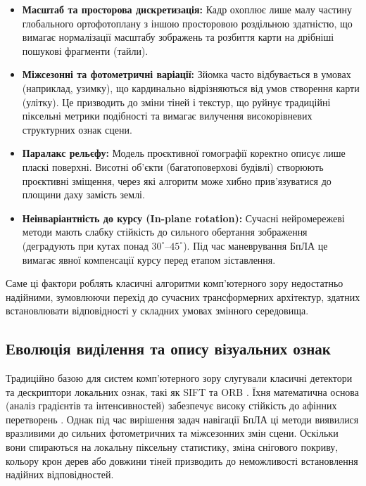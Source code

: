 \documentclass[a4paper, 12pt, titlepage]{article}
\begin{document}
\begin{itemize}
    \item \textbf{Масштаб та просторова дискретизація:} Кадр охоплює лише малу частину глобального ортофотоплану з іншою просторовою роздільною здатністю, що вимагає нормалізації масштабу зображень та розбиття карти на дрібніші пошукові фрагменти (тайли).
    \item \textbf{Міжсезонні та фотометричні варіації:} Зйомка часто відбувається в умовах (наприклад, узимку), що кардинально відрізняються від умов створення карти (улітку). Це призводить до зміни тіней і текстур, що руйнує традиційні піксельні метрики подібності та вимагає вилучення високорівневих структурних ознак сцени.
    \item \textbf{Паралакс рельєфу:} Модель проєктивної гомографії коректно описує лише пласкі поверхні. Висотні об'єкти (багатоповерхові будівлі) створюють проєктивні зміщення, через які алгоритм може хибно прив'язуватися до площини даху замість землі.
    \item \textbf{Неінваріантність до курсу (In-plane rotation):} Сучасні нейромережеві методи мають слабку стійкість до сильного обертання зображення (деградують при кутах понад $30^\circ$--$45^\circ$). Під час маневрування БпЛА це вимагає явної компенсації курсу перед етапом зіставлення.
\end{itemize}

Саме ці фактори роблять класичні алгоритми комп'ютерного зору недостатньо надійними, зумовлюючи перехід до сучасних трансформерних архітектур, здатних встановлювати відповідності у складних умовах змінного середовища.

\subsection{Еволюція виділення та опису візуальних ознак}

Традиційно базою для систем комп'ютерного зору слугували класичні детектори та дескриптори локальних ознак, такі як SIFT \cite{sift} та ORB \cite{orb}. Їхня математична основа (аналіз градієнтів та інтенсивностей) забезпечує високу стійкість до афінних перетворень \cite{classic_methods}. Однак під час вирішення задач навігації БпЛА ці методи виявилися вразливими до сильних фотометричних та міжсезонних змін сцени. Оскільки вони спираються на локальну піксельну статистику, зміна снігового покриву, кольору крон дерев або довжини тіней призводить до неможливості встановлення надійних відповідностей.
\end{document}
